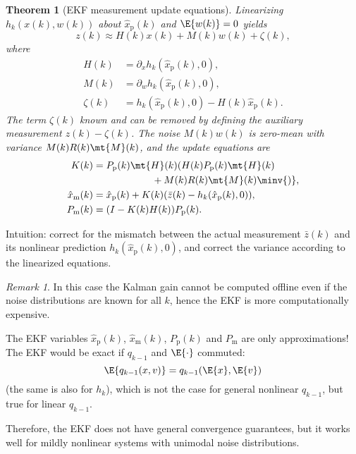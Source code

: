 \documentclass[margin=tiny]{hsrzf}
\theoremstyle{plain}
\newtheorem{thm}{Theorem}[section]
\theoremstyle{definition}
\theoremstyle{remark}
\newtheorem*{remark}{Remark}
\begin{document}
\begin{thm}[EKF measurement update equations]
  Linearizing $h_k(x(k), w(k))$ about $\hat{x}_\mathrm{p}(k)$ and $\E{w(k)} =
  0$ yields
  \[
    z(k) \approx H(k) x(k) + M(k) w(k) + \zeta(k),
  \]
  where
  \begin{align*}
    H(k) &= \partial_x h_{k}(\hat{x}_\mathrm{p}(k), 0), \\
    M(k) &= \partial_w h_{k}(\hat{x}_\mathrm{p}(k), 0), \\
    \zeta(k) &= h_k(\hat{x}_\mathrm{p}(k), 0) - H(k) \hat{x}_\mathrm{p}(k).
  \end{align*}
  The term $\zeta(k)$ known and can be removed by defining the auxiliary
  measurement $z(k) - \zeta(k)$. The noise $M(k)w(k)$ is zero-mean with
  variance $M(k)R(k)\mt{M}(k)$, and the update equations are
  \begin{align*}
    K(k) &= P_\mathrm{p}(k) \mt{H}(k) (
        H(k) P_\mathrm{p}(k) \mt{H}(k) \\
        &\qquad\qquad\qquad + M(k) R(k) \mt{M}(k) \minv{)}, \\
    \hat{x}_\mathrm{m}(k) &= \hat{x}_\mathrm{p}(k) + K(k) (
        \bar{z}(k) - h_k(\hat{x}_\mathrm{p}(k), 0)), \\
    P_\mathrm{m}(k) &= (I - K(k)H(k)) P_\mathrm{p}(k).
  \end{align*}
\end{thm}

Intuition: correct for the mismatch between the actual measurement
$\bar{z}(k)$ and its nonlinear prediction $h_k(\hat{x}_\mathrm{p}(k), 0)$,
and correct the variance according to the linearized equations.

\begin{remark}
  In this case the Kalman gain cannot be computed offline even if the noise
  distributions are known for all $k$, hence the EKF is more computationally
  expensive.
\end{remark}

The EKF variables $\hat{x}_\mathrm{p}(k)$, $\hat{x}_\mathrm{m}(k)$,
$P_\mathrm{p}(k)$ and $P_\mathrm{m}$ are only approximations! The EKF would be
exact if $q_{k-1}$ and $\E{\cdot}$ commuted:
\[
  \E{q_{k-1}(x, v)} = q_{k-1}(\E{x}, \E{v})
\]
(the same is also for $h_k$), which is not the case for general nonlinear
$q_{k-1}$, but true for linear $q_{k-1}$.

Therefore, the EKF does not have general convergence guarantees, but it works
well for mildly nonlinear systems with unimodal noise distributions.
\end{document}
